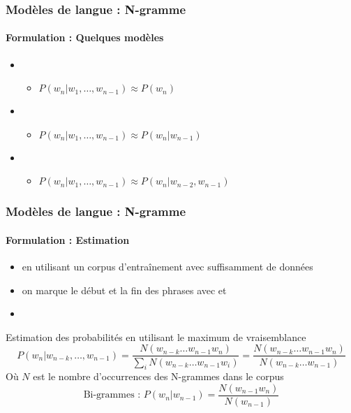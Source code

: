 \documentclass[xcolor=table]{beamer}
\begin{document}
\begin{frame}
\frametitle{Modèles de langue : N-gramme}
\framesubtitle{Formulation : Quelques modèles}

\begin{itemize}
	\item {}
	\begin{itemize}
		\item $P(w_n | w_1,\ldots, w_{n-1}) \approx P(w_n)$
	\end{itemize}
	\item {}
	\begin{itemize}
		\item $P(w_n | w_1,\ldots, w_{n-1}) \approx P(w_n | w_{n-1})$
	\end{itemize}
	\item {}
	\begin{itemize}
		\item $P(w_n | w_1,\ldots, w_{n-1}) \approx P(w_n | w_{n-2}, w_{n-1})$
	\end{itemize}
\end{itemize}

\end{frame}

\begin{frame}
\frametitle{Modèles de langue : N-gramme}
\framesubtitle{Formulation : Estimation}

\begin{itemize}
	\item en utilisant un corpus d'entraînement avec suffisamment de données
	\item on marque le début et la fin des phrases avec  et 
	\item {}
\end{itemize}

\begin{block}{Estimation des probabilités en utilisant le maximum de vraisemblance}
	\[%
	P(w_n | w_{n-k},\ldots, w_{n-1}) = \frac{N(w_{n-k} \ldots w_{n-1} w_n)}{\sum_i N(w_{n-k} \ldots w_{n-1} w_i)}
	= \frac{N(w_{n-k} \ldots w_{n-1} w_n)}{N(w_{n-k} \ldots w_{n-1})}
	\]
	Où $N$ est le nombre d'occurrences des N-grammes dans le corpus
	\[%
	\text{Bi-grammes : } P(w_n | w_{n-1}) = \frac{N(w_{n-1} w_n)}{N(w_{n-1})}
	\]
\end{block}

\end{frame}
\end{document}
